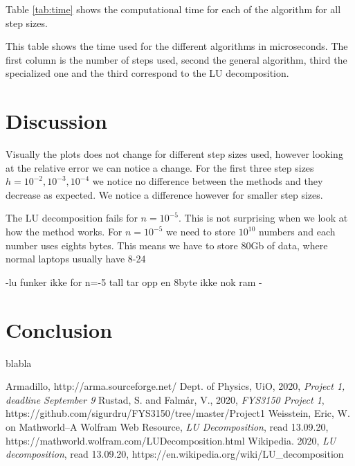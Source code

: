 \documentclass[reprint, english,notitlepage]{revtex4-1}  %
\begin{document}
Table \ref{tab:time} shows the computational time for each of the algorithm for all step sizes.

\begin{table}  %
  
  \caption{This table shows the time used for the different algorithms in microseconds. The first column is the number of steps used, second the general algorithm, third the specialized one and the third correspond to the LU decomposition.}
	\label{tab:time}
\end{table}



\section{Discussion}

Visually the plots does not change for different step sizes used, however looking at the relative error we can notice a change. For the first three step sizes $h = 10^{-2}, 10^{-3}, 10^{-4}$ we notice no difference between the methods and they decrease as expected. We notice a difference however for smaller step sizes.

The LU decomposition fails for $n=10^{-5}$. This is not surprising when we look at how the method works. For $n=10^{-5}$ we need to store $10^10$ numbers and each number uses eights bytes. This means we have to store 80Gb of data, where normal laptops usually have 8-24

-lu funker ikke for n=-5 tall tar opp en 8byte ikke nok ram
-


\section{Conclusion}

blabla



\onecolumngrid
\vspace{1cm} %
\newpage

\begin{thebibliography}{}
   Armadillo, http://arma.sourceforge.net/
   Dept. of Physics, UiO,  2020, \textit{Project 1, deadline September 9}
   Rustad, S. and Falmår, V.,  2020, \textit{FYS3150 Project 1}, https://github.com/sigurdru/FYS3150/tree/master/Project1
   Weisstein, Eric, W. on Mathworld--A Wolfram Web Resource, \textit{LU Decomposition}, read 13.09.20, https://mathworld.wolfram.com/LUDecomposition.html
   Wikipedia.  2020, \textit{LU decomposition}, read 13.09.20, https://en.wikipedia.org/wiki/LU\_decomposition
\end{thebibliography}
\end{document}
